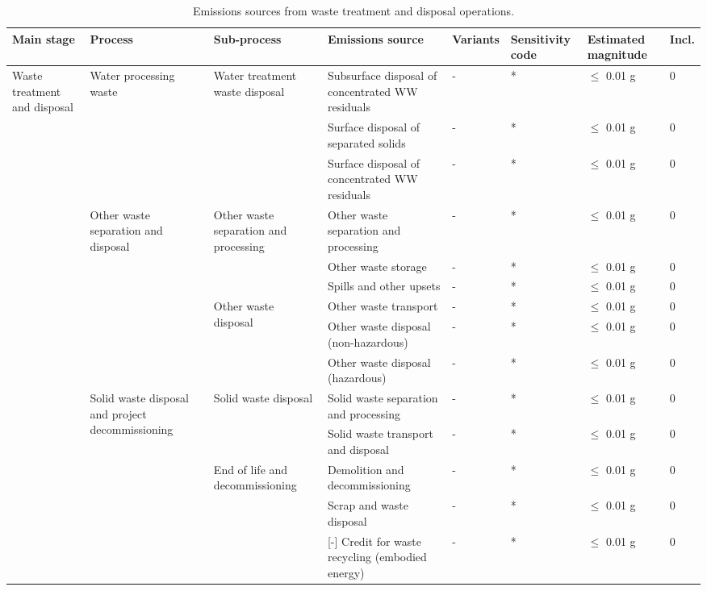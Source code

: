 \documentclass[11pt]{report}
\begin{document}
{{{{\begin{landscape}
\begin{table}
\begin{scriptsize}
\caption{Emissions sources from waste treatment and disposal operations.}
\label{tab:waste_sources}
\begin{tabular}{|p{}|p{}|p{}|p{}|p{}|p{}|p{}|p{}|}
\hline
\textbf{Main stage} & \textbf{Process} & \textbf{Sub-process} & \textbf{Emissions source} & \textbf{Variants}& \textbf{Sensitivity code} & \textbf{Estimated magnitude} & \textbf{Incl.}\\
\hline
\multirow{14}{0.08\columnwidth}{Waste treatment and disposal} & \multirow{3}{0.09\columnwidth}{Water processing waste} & \multirow{3}{0.12\columnwidth}{Water treatment waste disposal} & Subsurface disposal of concentrated WW residuals & - & * & $\leq$ 0.01 g & 0\\
\cline{4-8}
& & & Surface disposal of separated solids & - & * & $\leq$ 0.01 g & 0\\
\cline{4-8}
& & & Surface disposal of concentrated WW residuals & - & * & $\leq$ 0.01 g & 0\\
\cline{2-8}
& \multirow{6}{0.09\columnwidth}{Other waste separation and disposal} & \multirow{3}{0.12\columnwidth}{Other waste separation and processing} & Other waste separation and processing & - & * & $\leq$ 0.01 g & 0\\
\cline{4-8}
& & & Other waste storage & - & * & $\leq$ 0.01 g & 0\\
\cline{4-8}
& & & Spills and other upsets & - & * & $\leq$ 0.01 g & 0\\
\cline{3-8}
& & \multirow{3}{0.09\columnwidth}{Other waste disposal} & Other waste transport & - & * & $\leq$ 0.01 g & 0\\
\cline{4-8}
& & & Other waste disposal (non-hazardous) & - & * & $\leq$ 0.01 g & 0\\
\cline{4-8}
& & & Other waste disposal (hazardous) & - & * & $\leq$ 0.01 g & 0\\
\cline{2-8}
& \multirow{5}{0.09\columnwidth}{Solid waste disposal and project decommissioning} & \multirow{2}{0.12\columnwidth}{Solid waste disposal} & Solid waste separation and processing & - & * & $\leq$ 0.01 g & 0\\
\cline{4-8}
& & & Solid waste transport and disposal & - & * & $\leq$ 0.01 g & 0\\
\cline{3-8}
& & \multirow{3}{0.09\columnwidth}{End of life and decommissioning} & Demolition and decommissioning & - & * & $\leq$ 0.01 g & 0\\
\cline{4-8}
& & & Scrap and waste disposal & - & * & $\leq$ 0.01 g & 0\\
\cline{4-8}
& & & [-] Credit for waste recycling (embodied energy) & - & * & $\leq$ 0.01 g & 0\\
\hline
\end{tabular}
\end{scriptsize}
\end{table}



\end{landscape}}}}}
\end{document}
